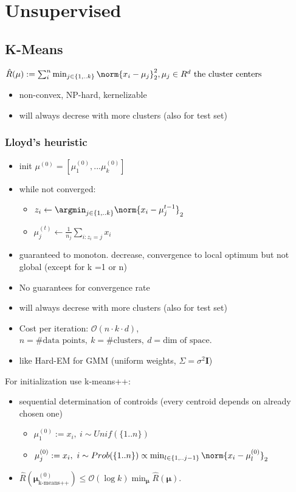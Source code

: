 \section{Unsupervised}
\subsection{K-Means}

$\hat{R}(\mu):= \sum_{i}^{n}\min_{j \in \{1,..k\}}\norm{x_{i}-\mu_{j}}_{2}^{2}, \mu_{j} \in R^{d} \text{ the cluster centers}$
\begin{itemize}
  \item non-convex, NP-hard, kernelizable
  \item will always decrese with more clusters (also for test set)
\end{itemize}

\subsubsection{Lloyd's heuristic}
\begin{itemize}
  \item init $\mu^{(0)} = [\mu_{1}^{(0)},... \mu_{k}^{(0)}]$
  \item while not converged:
    \begin{itemize}
    \item $z_{i} \leftarrow \argmin_{j \in \{1,..k\}} \norm{x_{i}-\mu_{j}^{t-1}}_{2}$
    \item $\mu_{j}^{(t)} \leftarrow \frac{1}{n_{j}} \sum_{i:z_{i} =j}x_{i}$
  \end{itemize}
  \item guaranteed to monoton. decrease, convergence to local optimum but not global (except for k =1 or n)
  \item No guarantees for convergence rate
  \item will always decrese with more clusters (also for test set)
  \item Cost per iteration: $\mathcal{O}(n \cdot k \cdot d)$, $n = \text{\#data points},\ k = \text{\#clusters}, \ d = \text{dim of space}$.
  \item like Hard-EM for GMM (uniform weights, $\Sigma = \sigma^{2} \bm{I}$)
\end{itemize}

For initialization use k-means++:
\begin{itemize}
  \item sequential determination of controids (every centroid depends on already chosen one)
  \begin{itemize}
    \item $\mu_{1}^{(0)}:= x_{i},\ i \sim Unif(\{1..n\})$
    \item $\mu_{j}^{(0)}:= x_{i},\ i \sim Prob(\{1..n\}) \propto \min_{l \in \{1,..j-1\}}\norm{x_{i}- \mu_{l}^{(0)}}_{2}$
  \end{itemize}
  \item $\widehat{R}(\bm{\mu}_{\text{k-means++}}^{(0)}) \leq \mathcal{O}(\log k)\min_{\bm{\mu}}\widehat{R}(\bm{\mu}).$
\end{itemize}


